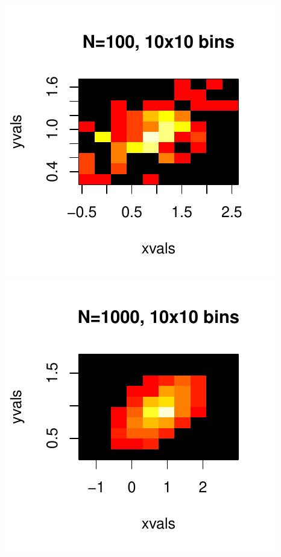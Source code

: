 \documentclass[a4paper, oneside, final]{memoir}
\begin{document}
\includegraphics{img/question17-plot-100.pdf}
\includegraphics{img/question17-plot-1000-10x10.pdf}
\end{document}
